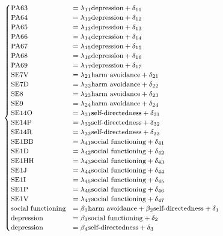 \documentclass[11pt]{article}
\begin{document}
\begin{equation}
    \footnotesize
    \label{eq:base_model}
    \begin{cases}
    \textrm{PA63}  & = \lambda_{11} \textrm{depression} + \delta_{11} \\
    \textrm{PA64}  & = \lambda_{12} \textrm{depression} + \delta_{12} \\
    \textrm{PA65}  & = \lambda_{13} \textrm{depression} + \delta_{13} \\
    \textrm{PA66}  & = \lambda_{14} \textrm{depression} + \delta_{14} \\
    \textrm{PA67}  & = \lambda_{15} \textrm{depression} + \delta_{15} \\
    \textrm{PA68}  & = \lambda_{16} \textrm{depression} + \delta_{16} \\
    \textrm{PA69}  & = \lambda_{17} \textrm{depression} + \delta_{17} \\
    \textrm{SE7V}  & = \lambda_{21} \textrm{harm avoidance} + \delta_{21} \\
    \textrm{SE7D}  & = \lambda_{22} \textrm{harm avoidance} + \delta_{22} \\
    \textrm{SE8}   & = \lambda_{23} \textrm{harm avoidance} + \delta_{23} \\
    \textrm{SE9}   & = \lambda_{24} \textrm{harm avoidance} + \delta_{24} \\
    \textrm{SE14O} & = \lambda_{31} \textrm{self-directedness} + \delta_{31} \\
    \textrm{SE14P} & = \lambda_{32} \textrm{self-directedness} + \delta_{32} \\
    \textrm{SE14R} & = \lambda_{33} \textrm{self-directedness} + \delta_{33} \\
    \textrm{SE1BB} & = \lambda_{41} \textrm{social functioning} + \delta_{41} \\
    \textrm{SE1D}  & = \lambda_{42} \textrm{social functioning} + \delta_{42} \\
    \textrm{SE1HH} & = \lambda_{43} \textrm{social functioning} + \delta_{43} \\
    \textrm{SE1J}  & = \lambda_{44} \textrm{social functioning} + \delta_{44} \\
    \textrm{SE1I}  & = \lambda_{45} \textrm{social functioning} + \delta_{45} \\
    \textrm{SE1P}  & = \lambda_{46} \textrm{social functioning} + \delta_{46} \\
    \textrm{SE1V}  & = \lambda_{47} \textrm{social functioning} + \delta_{47} \\
    \textrm{social functioning} & = \beta_1 \textrm{harm avoidance} + \beta_2 \textrm{self-directedness} + \delta_1 \\
    \textrm{depression} & = \beta_3 \textrm{social functioning} + \delta_2 \\
    \textrm{depression} & = \beta_4 \textrm{self-directedness} + \delta_3
    \end{cases}
\end{equation}
\end{document}
